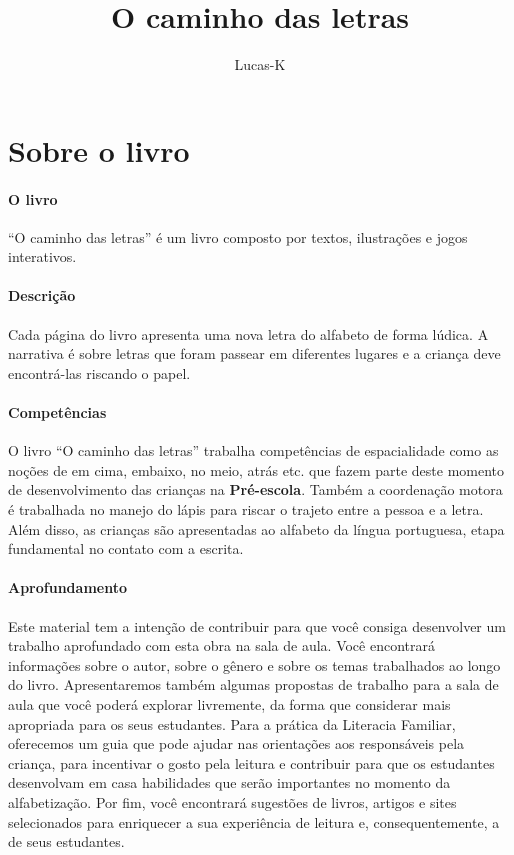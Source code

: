 \documentclass[11pt]{extarticle}
\newcommand{\AutorLivro}{Lucas-K}
\newcommand{\TituloLivro}{O caminho das letras}
\newcommand{\colaborador}{{Paulo Pompermaier e Renier Silva}}
\begin{document}
\title{\TituloLivro}
\author{\AutorLivro}
\def\authornotes{\colaborador}

\date{}
\maketitle


\tableofcontents



\section{Sobre o livro}

\paragraph{O livro} 
``O caminho das letras'' é um livro composto por textos,
ilustrações e jogos interativos. 
\paragraph{Descrição} 
Cada página do livro apresenta uma nova letra do alfabeto de forma lúdica.
A narrativa é sobre letras que foram passear em diferentes lugares e a 
criança deve encontrá-las riscando o papel.
\paragraph{Competências} 
O livro ``O caminho das letras'' trabalha competências de espacialidade como
as noções de em cima, embaixo, no meio, atrás etc. que fazem parte
deste momento de desenvolvimento das crianças na \textbf{Pré-escola}.
Também a coordenação motora é trabalhada no manejo do lápis para
riscar o trajeto entre a pessoa e a letra. Além disso, as crianças
são apresentadas ao alfabeto da língua portuguesa, etapa fundamental
no contato com a escrita. 
\paragraph{Aprofundamento} 
Este material tem a intenção de contribuir para que você consiga desenvolver um trabalho aprofundado 
com esta obra na sala de aula. Você encontrará informações sobre o autor, sobre 
o gênero e sobre os temas trabalhados ao longo do livro. Apresentaremos também 
algumas propostas de trabalho para a sala de aula que você poderá explorar livremente, 
da forma que considerar mais apropriada para os seus estudantes. Para a prática 
da Literacia Familiar, oferecemos um guia que pode ajudar nas orientações aos 
responsáveis pela criança, para incentivar o gosto pela leitura e contribuir para 
que os estudantes desenvolvam em casa habilidades que serão importantes no momento 
da alfabetização. Por fim, você encontrará sugestões de livros, artigos e sites 
selecionados para enriquecer a sua experiência de leitura e, 
consequentemente, a de seus estudantes.
\end{document}
